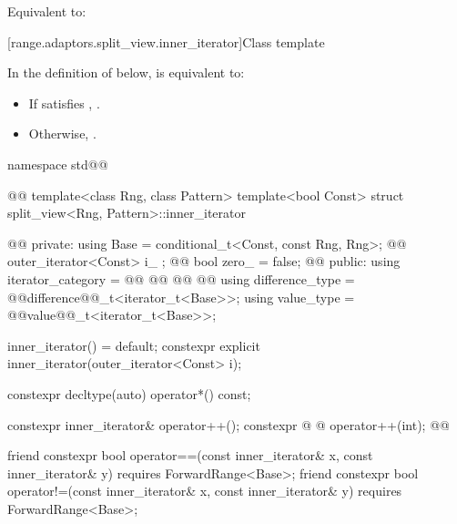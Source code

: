 {{\begin{itemdescr}
\pnum
\effects Equivalent to: 
\end{itemdescr}
} %

[range.adaptors.split_view.inner_iterator]{Class template }

\pnum
\begin{note}
\end{note}

{\color{oldclr}
\pnum
In the definition of  below,
 is equivalent to:
\begin{itemize}
\item If  satisfies , .

\item Otherwise, .
\end{itemize}
} %

\begin{codeblock}
namespace std@@ { @@
  template<class Rng, class Pattern>
  template<bool Const>
  struct split_view<Rng, Pattern>::inner_iterator { @\newtxt{// \expos}@
  private:
    using Base =
      conditional_t<Const, const Rng, Rng>; @\newtxt{// \expos}@
    outer_iterator<Const> i_ {};            @\newtxt{// \expos}@
    bool zero_ = false;                     @\newtxt{// \expos}@
  public:
    using iterator_category = @\newtxt{\seebelownc;}@
      @@
    @@
      @@
    using difference_type = @@difference@@_t<iterator_t<Base>>;
    using value_type = @@value@@_t<iterator_t<Base>>;

    inner_iterator() = default;
    constexpr explicit inner_iterator(outer_iterator<Const> i);

    constexpr decltype(auto) operator*() const;

    constexpr inner_iterator& operator++();
    constexpr @ @ operator++(int);
    @@

    friend constexpr bool operator==(const inner_iterator& x, const inner_iterator& y)
      requires ForwardRange<Base>;
    friend constexpr bool operator!=(const inner_iterator& x, const inner_iterator& y)
      requires ForwardRange<Base>;

}}
\end{codeblock}}
